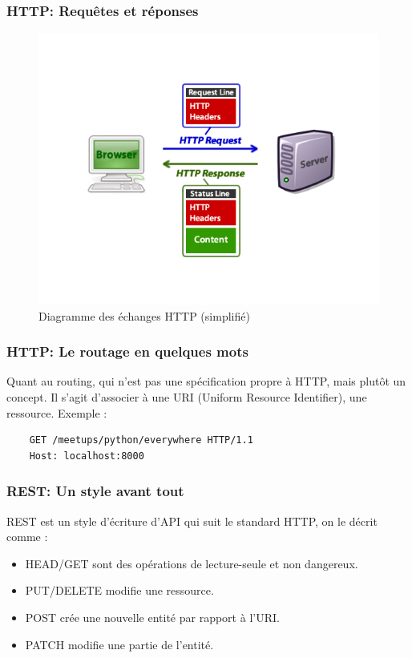 \documentclass[10pt, compress]{beamer}
\begin{document}
\begin{frame}[fragile]
	\frametitle{HTTP: Requêtes et réponses}
   	 \begin{figure}
    	\includegraphics[scale=0.35]{http_diagram.png}
    	\caption{Diagramme des échanges HTTP (simplifié)}
    \end{figure}
\end{frame}
\begin{frame}[fragile]
	\frametitle{HTTP: Le routage en quelques mots}
    
    Quant au routing, qui n'est pas une spécification propre à HTTP, mais plutôt un concept. Il s'agit d'associer à une URI (Uniform Resource Identifier), une ressource. \pause Exemple :
 
    \begin{verbatim}
    GET /meetups/python/everywhere HTTP/1.1
    Host: localhost:8000
    \end{verbatim}
\end{frame}
\begin{frame}[fragile]
	\frametitle{REST: Un style avant tout}
    
    REST est un style d'écriture d'API qui suit le standard HTTP, on le décrit comme :
    \pause
    \begin{itemize}[<+->]
    	\item HEAD/GET sont des opérations de lecture-seule et non dangereux.
        \item PUT/DELETE modifie une ressource.
        \item POST crée une nouvelle entité par rapport à l'URI.
        \item PATCH modifie une partie de l'entité.
    \end{itemize}
\end{frame}
\end{document}
